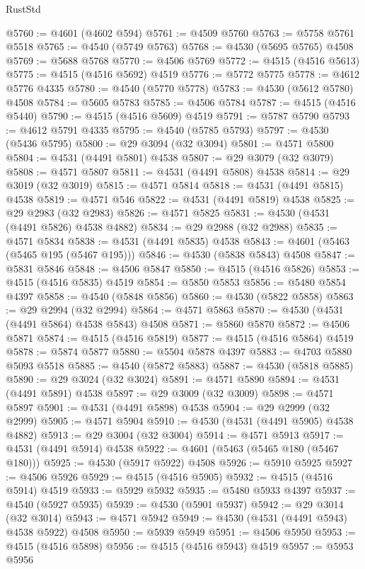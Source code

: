 \begin{lexlean}{RustStd}
\begin{coremodule}
@5760 := @4601 (@4602 @594)
@5761 := @4509 @5760
@5763 := @5758 @5761 @5518
@5765 := @4540 (@5749 @5763)
@5768 := @4530 (@5695 @5765) @4508
@5769 := @5688 @5768
@5770 := @4506 @5769
@5772 := @4515 (@4516 @5613)
@5775 := @4515 (@4516 @5692) @4519
@5776 := @5772 @5775
@5778 := @4612 @5776 @4335
@5780 := @4540 (@5770 @5778)
@5783 := @4530 (@5612 @5780) @4508
@5784 := @5605 @5783
@5785 := @4506 @5784
@5787 := @4515 (@4516 @5440)
@5790 := @4515 (@4516 @5609) @4519
@5791 := @5787 @5790
@5793 := @4612 @5791 @4335
@5795 := @4540 (@5785 @5793)
@5797 := @4530 (@5436 @5795)
@5800 := @29 @3094 (@32 @3094)
@5801 := @4571 @5800
@5804 := @4531 (@4491 @5801) @4538
@5807 := @29 @3079 (@32 @3079)
@5808 := @4571 @5807
@5811 := @4531 (@4491 @5808) @4538
@5814 := @29 @3019 (@32 @3019)
@5815 := @4571 @5814
@5818 := @4531 (@4491 @5815) @4538
@5819 := @4571 @546
@5822 := @4531 (@4491 @5819) @4538
@5825 := @29 @2983 (@32 @2983)
@5826 := @4571 @5825
@5831 := @4530 (@4531 (@4491 @5826) @4538 @4882)
@5834 := @29 @2988 (@32 @2988)
@5835 := @4571 @5834
@5838 := @4531 (@4491 @5835) @4538
@5843 := @4601 (@5463 (@5465 @195 (@5467 @195)))
@5846 := @4530 (@5838 @5843) @4508
@5847 := @5831 @5846
@5848 := @4506 @5847
@5850 := @4515 (@4516 @5826)
@5853 := @4515 (@4516 @5835) @4519
@5854 := @5850 @5853
@5856 := @5480 @5854 @4397
@5858 := @4540 (@5848 @5856)
@5860 := @4530 (@5822 @5858)
@5863 := @29 @2994 (@32 @2994)
@5864 := @4571 @5863
@5870 := @4530 (@4531 (@4491 @5864) @4538 @5843) @4508
@5871 := @5860 @5870
@5872 := @4506 @5871
@5874 := @4515 (@4516 @5819)
@5877 := @4515 (@4516 @5864) @4519
@5878 := @5874 @5877
@5880 := @5504 @5878 @4397
@5883 := @4703 @5880 @5093 @5518
@5885 := @4540 (@5872 @5883)
@5887 := @4530 (@5818 @5885)
@5890 := @29 @3024 (@32 @3024)
@5891 := @4571 @5890
@5894 := @4531 (@4491 @5891) @4538
@5897 := @29 @3009 (@32 @3009)
@5898 := @4571 @5897
@5901 := @4531 (@4491 @5898) @4538
@5904 := @29 @2999 (@32 @2999)
@5905 := @4571 @5904
@5910 := @4530 (@4531 (@4491 @5905) @4538 @4882)
@5913 := @29 @3004 (@32 @3004)
@5914 := @4571 @5913
@5917 := @4531 (@4491 @5914) @4538
@5922 := @4601 (@5463 (@5465 @180 (@5467 @180)))
@5925 := @4530 (@5917 @5922) @4508
@5926 := @5910 @5925
@5927 := @4506 @5926
@5929 := @4515 (@4516 @5905)
@5932 := @4515 (@4516 @5914) @4519
@5933 := @5929 @5932
@5935 := @5480 @5933 @4397
@5937 := @4540 (@5927 @5935)
@5939 := @4530 (@5901 @5937)
@5942 := @29 @3014 (@32 @3014)
@5943 := @4571 @5942
@5949 := @4530 (@4531 (@4491 @5943) @4538 @5922) @4508
@5950 := @5939 @5949
@5951 := @4506 @5950
@5953 := @4515 (@4516 @5898)
@5956 := @4515 (@4516 @5943) @4519
@5957 := @5953 @5956

\end{coremodule}
\end{lexlean}
